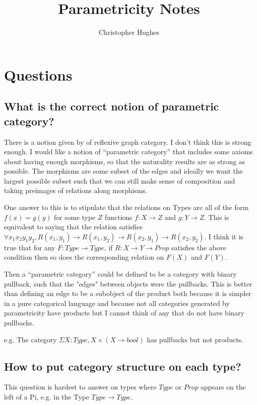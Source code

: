 \documentclass[12pt]{article} %
\title{Parametricity Notes}
\author{Christopher Hughes}
\theoremstyle{definition}
\theoremstyle{definition}
\theoremstyle{definition}
\theoremstyle{definition}
\begin{document}
\section{Questions}

\subsection{What is the correct notion of parametric category?}

There is a notion given by \cite{Hermida2014LogicalRA} of reflexive graph category. 
I don't think this is strong enough. I would like a notion of ``parametric category'' that
includes some axioms about having enough morphisms, so that the naturality results are as strong as
possible. The morphisms are some subset of the edges and ideally we want the largest 
possible subset such that we can still make sense of composition and taking preimages of relations
along morphisms.

One answer to this is to stipulate that the relations on Types are all of the form $f(x) = g(y)$ for 
some type $Z$ functions $f : X \rightarrow Z$ and $g : Y \rightarrow Z$. This is equivalent to saying
that the relation satisfies $\forall x_1 x_2 y_1 y_2, R(x_1, y_1) \rightarrow R(x_1, y_2) 
\rightarrow R(x_2, y_1) \rightarrow R(x_2, y_2)$.
I think it is true that for any $F : Type \rightarrow Type$, if $R : X \rightarrow Y \rightarrow Prop$
satisfies the above condition then so does the corresponding relation on $F(X)$ and $F(Y)$.

Then a ``parametric category'' could be defined to be a category with binary pullback, such that 
the "edges" between objects were the pullbacks. This is better than defining an edge to be a subobject 
of the product both because it is simpler in a pure categorical language and because not all categories
generated by parametricity have products but I cannot think of any that do not have binary pullbacks.

e.g. The category $\Sigma X : Type, X \times (X \to bool)$ has pullbacks but not products. 


\subsection{How to put category structure on each type?}

This question is hardest to answer on types where $Type$ or $Prop$ appears on the left of a Pi,
e.g. in the Type $Type\rightarrow Type$.
\end{document}
